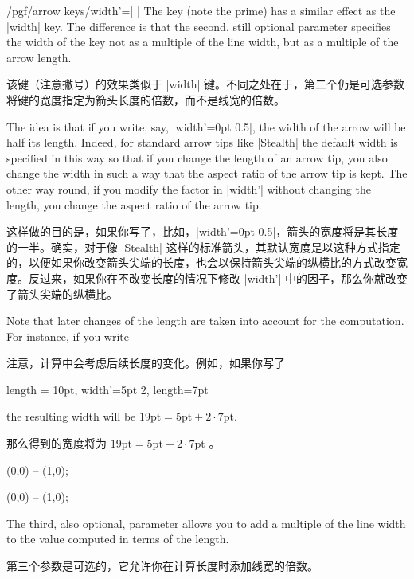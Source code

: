 \begin{key}{/pgf/arrow keys/width'=| |}
    The key (note the prime) has a similar effect as the |width| key. The
    difference is that the second, still optional parameter  specifies the width of the key not as a multiple of the line width,
    but as a multiple of the arrow length.

    该键（注意撇号）的效果类似于 |width| 键。不同之处在于，第二个仍是可选参数  将键的宽度指定为箭头长度的倍数，而不是线宽的倍数。

    The idea is that if you write, say, |width'=0pt 0.5|, the width of the
    arrow will be half its length. Indeed, for standard arrow tips like
    |Stealth| the default width is specified in this way so that if you change
    the length of an arrow tip, you also change the width in such a way that
    the aspect ratio of the arrow tip is kept. The other way round, if you
    modify the factor in |width'| without changing the length, you change the
    aspect ratio of the arrow tip.

    这样做的目的是，如果你写了，比如，|width'=0pt 0.5|，箭头的宽度将是其长度的一半。确实，对于像 |Stealth| 这样的标准箭头，其默认宽度是以这种方式指定的，以便如果你改变箭头尖端的长度，也会以保持箭头尖端的纵横比的方式改变宽度。反过来，如果你在不改变长度的情况下修改 |width'| 中的因子，那么你就改变了箭头尖端的纵横比。

    Note that later changes of the length are taken into account for the
    computation. For instance, if you write

    注意，计算中会考虑后续长度的变化。例如，如果你写了


\begin{codeexample}
length = 10pt, width'=5pt 2, length=7pt
\end{codeexample}
    the resulting width will be $19\mathrm{pt} = 5\mathrm{pt} + 2\cdot
    7\mathrm{pt}$.
    
    
    那么得到的宽度将为 $19\mathrm{pt} = 5\mathrm{pt} + 2\cdot 7\mathrm{pt}$ 。%
\begin{codeexample}[preamble={\usetikzlibrary{arrows.meta}}]
\tikz \draw [arrows = {-Latex[width'=0pt .5, length=10pt]}] (0,0) -- (1,0);
\end{codeexample}
\begin{codeexample}[preamble={\usetikzlibrary{arrows.meta}}]
\tikz \draw [arrows = {-Latex[width'=0pt .5, length=15pt]}] (0,0) -- (1,0);
\end{codeexample}
    The third, also optional, parameter allows you to add a multiple of the
    line width to the value computed in terms of the length.

    第三个参数是可选的，它允许你在计算长度时添加线宽的倍数。
\end{key}


